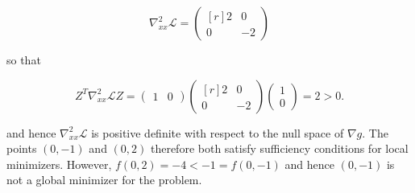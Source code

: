 \begin{solution}
    $$
    \nabla^2_{xx} \mathcal{L} = \begin{pmatrix*}[r]
        2 & 0 \\
        0 & -2
    \end{pmatrix*}
    $$

    so that

    $$
    Z^T \nabla^2_{xx} \mathcal{L} Z = \begin{pmatrix*}
        1 & 0
    \end{pmatrix*} \begin{pmatrix*}[r]
        2 & 0 \\
        0 & -2
    \end{pmatrix*} \begin{pmatrix*}
        1 \\
        0
    \end{pmatrix*} = 2 > 0.
    $$

    and hence $\nabla^2_{xx} \mathcal{L}$ is positive definite with respect to the null space of $\nabla g$. The points
    $(0, -1)$ and $(0, 2)$ therefore both satisfy sufficiency conditions for local minimizers. 
    However, $f(0, 2) = -4 < -1 = f(0, -1)$ and hence $(0, -1)$ is not a global minimizer for the problem.
    \ \\
\end{solution}
